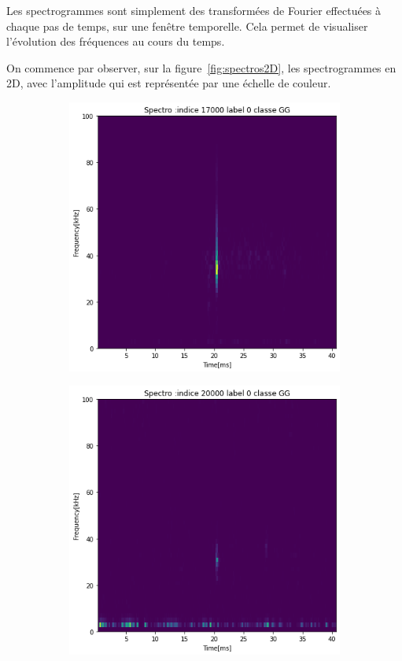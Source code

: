 Les spectrogrammes sont simplement des transformées de Fourier effectuées à chaque pas de temps, sur une fenêtre temporelle. Cela permet de visualiser l'évolution des fréquences au cours du temps.

On commence par observer, sur la figure~\ref{fig:spectros2D}, les spectrogrammes en 2D, avec l'amplitude qui est représentée par une échelle de couleur.

\begin{figure}[!h]
  \centering
  \begin{subfigure}[b]{0.3\textwidth}
    \includegraphics[width=\textwidth]{./images/indice17000Spectro2Dlabel0classeGGsansprocessingsanszoom.png}
    \caption{}
  \end{subfigure}
  \begin{subfigure}[b]{0.3\textwidth}
    \includegraphics[width=\textwidth]{./images/indice20000Spectro2Dlabel9classeZCsansprocessingsanszoom.png}

\end{subfigure}
\end{figure}
